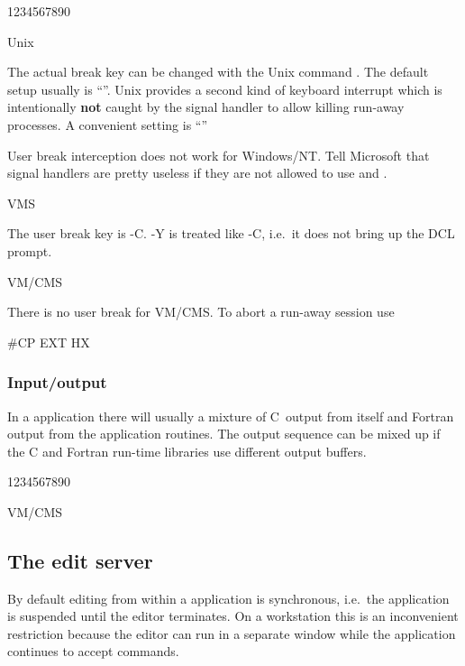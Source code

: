 \begin{DL}{1234567890}
\item[Unix]

The actual break key can be changed with the Unix command .
The default setup usually is ``''.
Unix provides a second kind of keyboard interrupt which is intentionally
\textbf{not} caught by the \KUIP{} signal handler to allow killing
run-away processes.
A convenient setting is ``''

User break interception does not work for Windows/NT.
Tell Microsoft that signal handlers are pretty useless if they are not
allowed to use  and .


\item[VMS]

The user break key is -C.
-Y is treated like -C, i.e.\ it does not bring up
the DCL prompt.


\item[VM/CMS]

There is no user break for VM/CMS.
To abort a run-away session use
\begin{XMP}
#CP EXT
HX
\end{XMP}

\end{DL}

\subsubsection{Input/output}

In a \KUIP{} application there will usually a mixture of C~output from
\KUIP{} itself and Fortran output from the application routines.
The output sequence can be mixed up if the C and Fortran run-time libraries use
different output buffers.

\begin{DL}{1234567890}
\item[VM/CMS]


\end{DL}
\fi


\subsection{The edit server}

By default editing from within a \KUIP{} application is synchronous,
i.e.\ the application is suspended until the editor terminates.
On a workstation this is an inconvenient restriction because the
editor can run in a separate window while the application continues to
accept commands.

